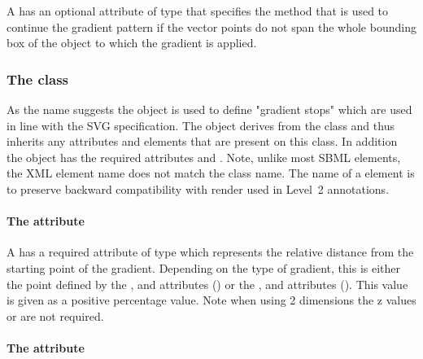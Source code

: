 A \GradientBase has an optional attribute  of type
\GradientSpreadMethod that specifies the method that is
used to continue the gradient pattern if the vector points do not span the whole
bounding box of the object to which the gradient is applied. 

%
%

\subsubsection{The  class}
\label{gradientstop-class}

As the name suggests the \GradientStop object is used to define "gradient stops" 
which are used in line with the SVG specification.
The \GradientStop object derives from the \SBase class and thus inherits
any attributes and elements that are present on this class.
In addition the \GradientStop object has the required attributes 
and . Note, unlike most SBML elements, the XML element name does not match the class name. The name of a \GradientStop element is  to preserve backward compatibility with render used in Level~2 annotations.

\paragraph{The \fixttspace{} attribute}

A \GradientStop has a required attribute  of type
\RelAbsVector which represents the relative distance from the starting point of 
the gradient. Depending on the type of gradient, this is either the point 
defined by the , and  attributes (\LinearGradient) 
or the ,  and  attributes (\RadialGradient). 
This value is given as a positive percentage value. Note when using 2 dimensions the z values  or  are not required.

\paragraph{The \fixttspace{} attribute}

